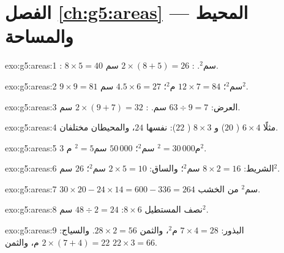 \section*{الفصل \ref{ch:g5:areas} --- المحيط والمساحة}

\begin{solution}{exo:g5:areas:1}
: $8 \times 5 = 40$ سم$^2$. :
$2 \times (8 + 5) = 26$ سم.
\end{solution}

\begin{solution}{exo:g5:areas:2}
$9 \times 9 = 81$ سم$^2$؛ \quad $12 \times 7 = 84$ م$^2$؛ \quad
$4.5 \times 6 = 27$ سم$^2$.
\end{solution}

\begin{solution}{exo:g5:areas:3}
العرض: $63 \div 9 = 7$ سم. : $2 \times (9 + 7) = 32$ سم.
\end{solution}

\begin{solution}{exo:g5:areas:4}
مثلًا $6 \times 4$ ( $20$) و $8 \times 3$
( $22$):  نفسها $24$، والمحيطان مختلفان.
\end{solution}

\begin{solution}{exo:g5:areas:5}
$3$ م$^2 = 30\,000$ سم$^2$؛ \quad $50\,000$ سم$^2 = 5$ م$^2$.
\end{solution}

\begin{solution}{exo:g5:areas:6}
الشريط: $8 \times 2 = 16$ سم$^2$؛ والساق: $2 \times 5 = 10$ سم$^2$؛
 $26$ سم$^2$.
\end{solution}

\begin{solution}{exo:g5:areas:7}
$30 \times 20 - 24 \times 14 = 600 - 336 = 264$ سم$^2$ من الخشب.
\end{solution}

\begin{solution}{exo:g5:areas:8}
نصف المستطيل $8 \times 6$: $48 \div 2 = 24$ سم$^2$.
\end{solution}

\begin{solution}{exo:g5:areas:9}
البذور:  $7 \times 4 = 28$ م$^2$، والثمن $28 \times 2 = 56$.
والسياج:  $2 \times (7 + 4) = 22$ م، والثمن
$22 \times 3 = 66$.
\end{solution}

